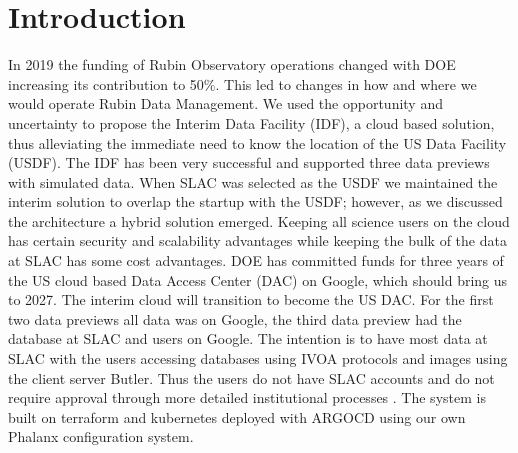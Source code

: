 \section{Introduction}
In 2019 the funding of Rubin Observatory operations changed with DOE increasing its contribution to 50\%. This led to changes in how and where we would operate Rubin Data Management. We used the opportunity and uncertainty to propose the Interim Data Facility (IDF), a cloud based solution,   thus alleviating the immediate need to know the location of the  US Data Facility (USDF). The IDF has been very successful and supported three data previews with simulated data. When SLAC was selected as the USDF we maintained the interim solution to overlap the startup with the USDF; however, as we discussed the architecture a hybrid solution emerged. Keeping all science users on the cloud has certain security and scalability advantages while keeping the bulk of the data at SLAC has some cost advantages. DOE has committed funds for three years of the US cloud based Data Access Center (DAC) on Google, which should bring us to 2027. The interim cloud will transition to become the US DAC. For the first two data previews all data was on Google, the third data preview had the database at SLAC and users on Google. The intention is to have most data at SLAC with the users accessing databases using IVOA protocols and images using the client server Butler. Thus the users do not have SLAC accounts and do not  require approval through more detailed institutional processes .  The system is built on terraform and kubernetes deployed with ARGOCD using our own Phalanx configuration system.









